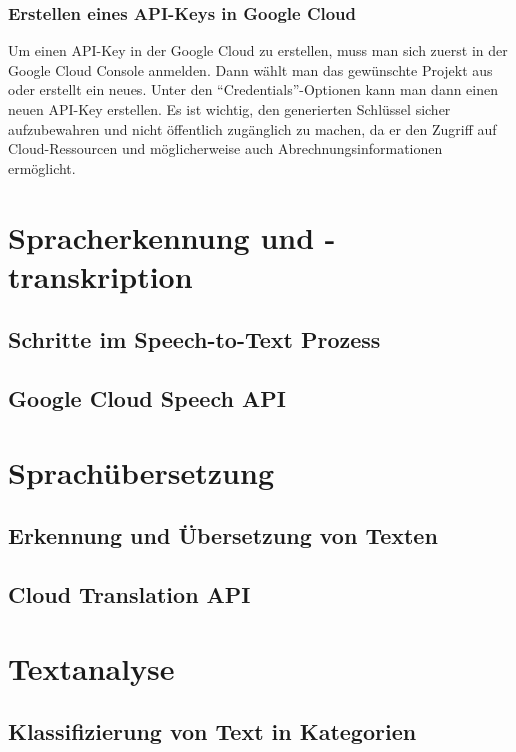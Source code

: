 \documentclass[12pt,a4paper]{article}
\begin{document}
\subsubsection{Erstellen eines API-Keys in Google Cloud}
Um einen API-Key in der Google Cloud zu erstellen, muss man sich zuerst in der Google Cloud Console anmelden. Dann wählt man das gewünschte Projekt aus oder erstellt ein neues. Unter den \enquote{Credentials}-Optionen kann man dann einen neuen API-Key erstellen. Es ist wichtig, den generierten Schlüssel sicher aufzubewahren und nicht öffentlich zugänglich zu machen, da er den Zugriff auf Cloud-Ressourcen und möglicherweise auch Abrechnungsinformationen ermöglicht.
	




\newpage
\section{Spracherkennung und -transkription}
\subsection{Schritte im Speech-to-Text Prozess}
\subsection{Google Cloud Speech API}


\newpage

\section{Sprachübersetzung}
\subsection{Erkennung und Übersetzung von Texten}
\subsection{Cloud Translation API}

\newpage

\section{Textanalyse}
\subsection{Klassifizierung von Text in Kategorien}
\end{document}
